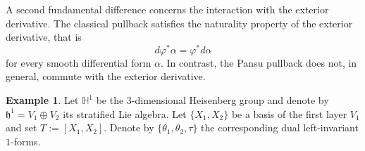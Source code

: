 \documentclass[dvipsnames]{amsart}
\theoremstyle{definition}
\newtheorem{example}[theorem]{Example}
\theoremstyle{definition}
\numberwithin{equation}{section}
\begin{document}
\medskip
A second fundamental difference concerns the interaction with the exterior derivative. The classical pullback satisfies the naturality property of the exterior derivative, that is
\begin{equation*}
    d\varphi^*\alpha = \varphi^*d\alpha
\end{equation*}
for every smooth differential form $\alpha$. In contrast, the Pansu pullback does not, in general, commute with the exterior derivative.


\begin{example}\label{example not commutativity}
    Let $\mathbb{H}^1$ be the $3$-dimensional Heisenberg group and denote by $\mathfrak{h}^1 = V_1 \oplus V_2$ its stratified Lie algebra. Let $\{X_1, X_2\}$ be a basis of the first layer $V_1$ and set $T:= [X_1, X_2]$. Denote by $\{\theta_1, \theta_2, \tau\}$ the corresponding dual left-invariant $1$-forms.
    

\end{example}
\end{document}
